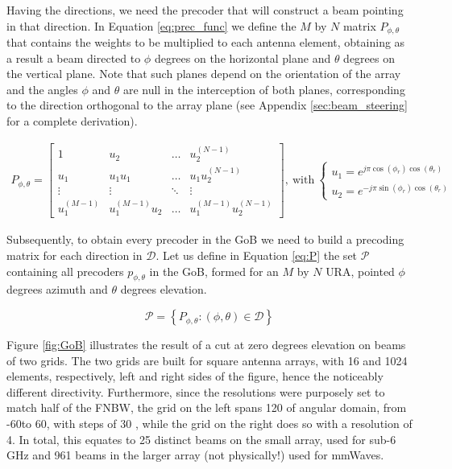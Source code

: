 Having the directions, we need the precoder that will construct a beam pointing in that direction. In Equation \eqref{eq:prec_func} we define the $M$ by $N$ matrix $P_{\phi, \theta}$ that contains the weights to be multiplied to each antenna element, obtaining as a result a beam directed to $\phi$ degrees on the horizontal plane and $\theta$ degrees on the vertical plane. Note that such planes depend on the orientation of the array and the angles $\phi$ and $\theta$ are null in the interception of both planes, corresponding to the direction orthogonal to the array plane (see Appendix \ref{sec:beam_steering} for a complete derivation).


\begin{align} \label{eq:prec_func}
    P_{\phi, \theta}= 
    \begin{bmatrix}
        1 & u_2 & \dots & u_2^{(N-1)}\\
        u_1 & u_1 u_1 & \dots & u_1 u_2^{(N-1)}\\
        \vdots & \vdots & \ddots & \vdots\\
        u_1^{(M-1)} & u_1^{(M-1)} u_2 & \dots & u_1^{(M-1)} u_2^{(N-1)}
    \end{bmatrix}, \ \text{with} \
    \begin{cases}
        u_1 = e^{j \pi \cos(\phi_r) \cos(\theta_r)} \\
        u_2 = e^{-j \pi \sin(\phi_r) \cos(\theta_r)}
    \end{cases}
\end{align}


Subsequently, to obtain every precoder in the GoB we need to build a precoding matrix for each direction in $\mathcal{D}$. Let us define in Equation \eqref{eq:P} the set $\mathcal{P}$ containing all precoders $p_{\phi, \theta}$ in the GoB, formed for an $M$ by  $N$ \ac{URA}, pointed $\phi$ degrees azimuth and $\theta$ degrees elevation. 

\begin{equation} \label{eq:P}
    \mathcal{P} = \left\{ P_{\phi, \theta} : (\phi, \theta) \in \mathcal{D}\right\}
\end{equation}

Figure \ref{fig:GoB} illustrates the result of a cut at zero degrees elevation on beams of two grids. The two grids are built for square antenna arrays, with 16 and 1024 elements, respectively, left and right sides of the figure, hence the noticeably different directivity. Furthermore, since the resolutions were purposely set to match half of the \ac{FNBW}, the grid on the left spans 120 \textdegree of angular domain, from -60\textdegree to 60\textdegree, with steps of 30 \textdegree, while the grid on the right does so with a resolution of 4\textdegree. In total, this equates to 25 distinct beams on the small array, used for sub-6 GHz and 961 beams in the larger array (not physically!) used for mmWaves.




